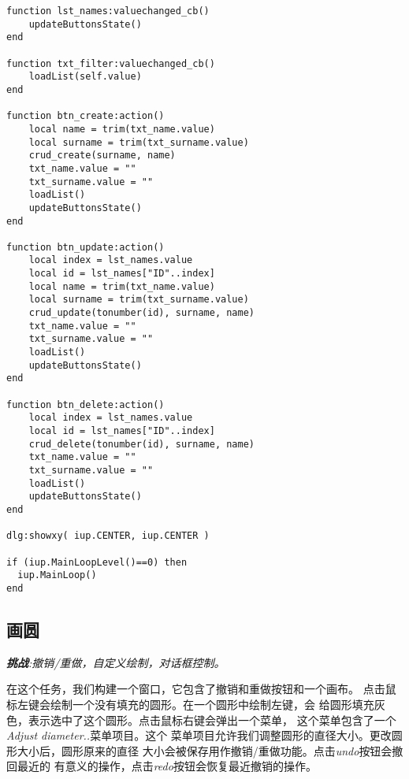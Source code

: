 \documentclass{ctexart}
\begin{document}
\begin{lstlisting}
function lst_names:valuechanged_cb()
	updateButtonsState()
end

function txt_filter:valuechanged_cb()	
	loadList(self.value)
end

function btn_create:action()
	local name = trim(txt_name.value)
	local surname = trim(txt_surname.value)
	crud_create(surname, name)
	txt_name.value = ""
	txt_surname.value = ""
	loadList()
	updateButtonsState()
end

function btn_update:action()
	local index = lst_names.value
	local id = lst_names["ID"..index]
  	local name = trim(txt_name.value)
	local surname = trim(txt_surname.value)
	crud_update(tonumber(id), surname, name)
	txt_name.value = ""
	txt_surname.value = ""
	loadList()
	updateButtonsState()
end

function btn_delete:action()
	local index = lst_names.value
	local id = lst_names["ID"..index]
	crud_delete(tonumber(id), surname, name)
	txt_name.value = ""
	txt_surname.value = ""
	loadList()
	updateButtonsState()
end

dlg:showxy( iup.CENTER, iup.CENTER )

if (iup.MainLoopLevel()==0) then
  iup.MainLoop()
end
\end{lstlisting}

\subsection{画圆}

\emph{\textbf{挑战}:撤销/重做，自定义绘制，对话框控制。}

在这个任务，我们构建一个窗口，它包含了撤销和重做按钮和一个画布。
点击鼠标左键会绘制一个没有填充的圆形。在一个圆形中绘制左键，会
给圆形填充灰色，表示选中了这个圆形。点击鼠标右键会弹出一个菜单，
这个菜单包含了一个\emph{Adjust diameter..}菜单项目。这个
菜单项目允许我们调整圆形的直径大小。更改圆形大小后，圆形原来的直径
大小会被保存用作撤销/重做功能。点击\emph{undo}按钮会撤回最近的
有意义的操作，点击\emph{redo}按钮会恢复最近撤销的操作。
\end{document}
